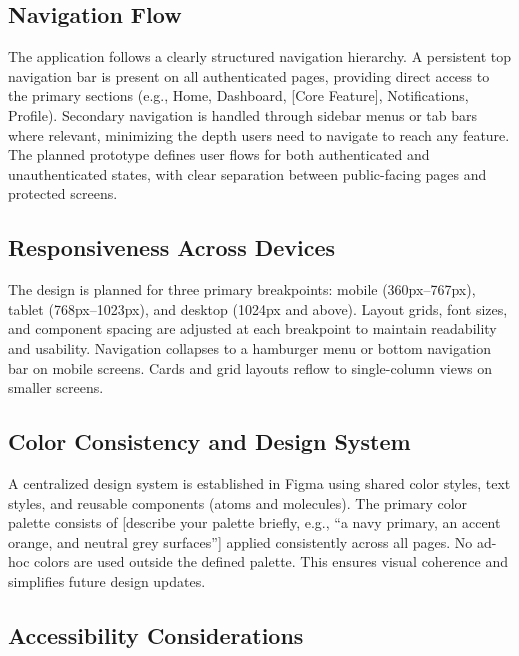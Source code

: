 \documentclass[12pt, a4paper]{article}
\begin{document}
\subsection{Navigation Flow}

The application follows a clearly structured navigation hierarchy. A persistent top navigation bar is present on all authenticated pages, providing direct access to the primary sections (e.g., Home, Dashboard, [Core Feature], Notifications, Profile). Secondary navigation is handled through sidebar menus or tab bars where relevant, minimizing the depth users need to navigate to reach any feature. The planned prototype defines user flows for both authenticated and unauthenticated states, with clear separation between public-facing pages and protected screens.

\subsection{Responsiveness Across Devices}

The design is planned for three primary breakpoints: mobile (360px--767px), tablet (768px--1023px), and desktop (1024px and above). Layout grids, font sizes, and component spacing are adjusted at each breakpoint to maintain readability and usability. Navigation collapses to a hamburger menu or bottom navigation bar on mobile screens. Cards and grid layouts reflow to single-column views on smaller screens.

\subsection{Color Consistency and Design System}

A centralized design system is established in Figma using shared color styles, text styles, and reusable components (atoms and molecules). The primary color palette consists of [describe your palette briefly, e.g., ``a navy primary, an accent orange, and neutral grey surfaces''] applied consistently across all pages. No ad-hoc colors are used outside the defined palette. This ensures visual coherence and simplifies future design updates.

\subsection{Accessibility Considerations}
\end{document}
